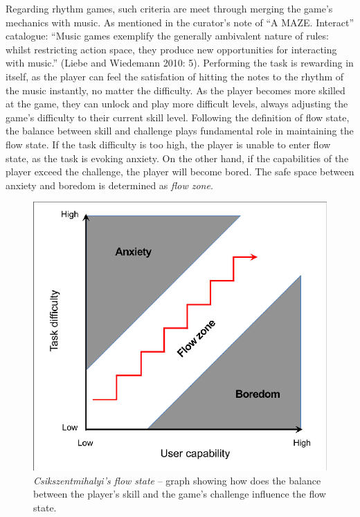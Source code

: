 Regarding rhythm games, such criteria are meet through merging the game’s mechanics with music. As mentioned in the curator’s note of “A MAZE. Interact” \cite{MAZE} catalogue: “Music games exemplify the generally ambivalent nature of rules: whilst restricting action space, they produce new opportunities for interacting with music.” (Liebe and Wiedemann 2010: 5). Performing the task is rewarding in itself, as the player can feel the satisfation of hitting the notes to the rhythm of the music instantly, no matter the difficulty. As the player becomes more skilled at the game, they can unlock and play more difficult levels, always adjusting the game’s difficulty to their current skill level. Following the definition of flow state, the balance between skill and challenge plays fundamental role in maintaining the flow state. If the task difficulty is too high, the player is unable to enter flow state, as the task is evoking anxiety. On the other hand, if the capabilities of the player exceed the challenge, the player will become bored. The safe space between anxiety and boredom is determined as \textit{flow zone}.

\begin{figure}[h]
    \centering\includegraphics[scale=0.3]{obrazki/flowstategraph.png}
    \caption{\textit{Csikszentmihalyi’s flow state} -- graph showing how does the balance between the player’s skill and the game’s challenge influence the flow state.
    \cite{csikszentmihalyi1990flow}}
    \label{fig:flowstategraph}
\end{figure}

